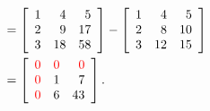 \begin{example}
\begin{align*}
    &=  \left[\begin{array}{rrr} 
    1   &  4   &  5 \\
     2  &   9  &  17 \\
     3  &  18  &  58 \end{array}  \right] - 
     \left[\begin{array}{rrr} 
    1   &  4   &  5 \\
     2  &   8  &  10 \\
     3  &  12  &  15 \end{array}  \right]\\
     &=\left[\begin{array}{rrr} 
      \color{red} 0  &    \color{red} 0  &   \color{red}  0 \\
      \color{red}  0   &  1   &  7 \\
     \color{red}   0   &  6   & 43 \end{array}  \right].
\end{align*}


\end{example}
